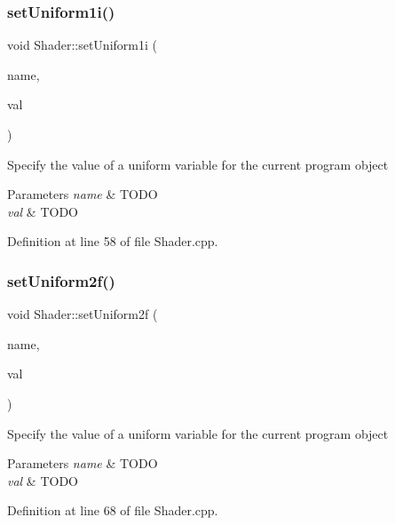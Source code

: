 \subsubsection{\texorpdfstring{set\+Uniform1i()}{setUniform1i()}}
{\footnotesize\ttfamily void Shader\+::set\+Uniform1i (\begin{DoxyParamCaption}\item[{const G\+Lchar $\ast$}]{name,  }\item[{const int}]{val }\end{DoxyParamCaption})}

Specify the value of a uniform variable for the current program object 
\begin{DoxyParams}{Parameters}
{\em name} & T\+O\+DO \\
\hline
{\em val} & T\+O\+DO \\
\hline
\end{DoxyParams}


Definition at line 58 of file Shader.\+cpp.

\mbox{\label{class_shader_a80c178459f4ac07e83c53a95dc1c5ec8}} 
\subsubsection{\texorpdfstring{set\+Uniform2f()}{setUniform2f()}}
{\footnotesize\ttfamily void Shader\+::set\+Uniform2f (\begin{DoxyParamCaption}\item[{const G\+Lchar $\ast$}]{name,  }\item[{const glm\+::vec2 \&}]{val }\end{DoxyParamCaption})}

Specify the value of a uniform variable for the current program object 
\begin{DoxyParams}{Parameters}
{\em name} & T\+O\+DO \\
\hline
{\em val} & T\+O\+DO \\
\hline
\end{DoxyParams}


Definition at line 68 of file Shader.\+cpp.

\mbox{\label{class_shader_a3ea68dd9c68a88fcc2d7abe873c9ecf2}} 
